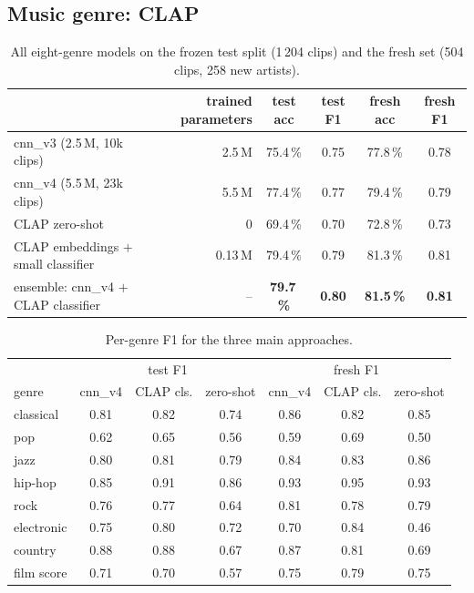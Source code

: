 \documentclass[11pt]{article}
\begin{document}
\subsection{Music genre: CLAP}
\begin{table}[H]\centering\small
\begin{tabular}{lrcccc}\toprule
 & trained parameters & test acc & test F1 & fresh acc & fresh F1 \\\midrule
cnn\_v3 (2.5\,M, 10k clips) & 2.5\,M & 75.4\,\% & 0.75 & 77.8\,\% & 0.78 \\
cnn\_v4 (5.5\,M, 23k clips) & 5.5\,M & 77.4\,\% & 0.77 & 79.4\,\% & 0.79 \\
CLAP zero-shot & 0 & 69.4\,\% & 0.70 & 72.8\,\% & 0.73 \\
CLAP embeddings $+$ small classifier & 0.13\,M & 79.4\,\% & 0.79 & 81.3\,\% & 0.81 \\
ensemble: cnn\_v4 $+$ CLAP classifier & -- & \textbf{79.7\,\%} & \textbf{0.80} & \textbf{81.5\,\%} & \textbf{0.81} \\\bottomrule
\end{tabular}
\caption{All eight-genre models on the frozen test split (1\,204 clips) and the fresh set (504 clips, 258 new artists).}\label{tab:final}
\end{table}
\begin{table}[H]\centering\small
\begin{tabular}{lccc|ccc}\toprule
 & \multicolumn{3}{c|}{test F1} & \multicolumn{3}{c}{fresh F1} \\
genre & cnn\_v4 & CLAP cls. & zero-shot & cnn\_v4 & CLAP cls. & zero-shot \\\midrule
classical & 0.81 & 0.82 & 0.74 & 0.86 & 0.82 & 0.85 \\
pop & 0.62 & 0.65 & 0.56 & 0.59 & 0.69 & 0.50 \\
jazz & 0.80 & 0.81 & 0.79 & 0.84 & 0.83 & 0.86 \\
hip-hop & 0.85 & 0.91 & 0.86 & 0.93 & 0.95 & 0.93 \\
rock & 0.76 & 0.77 & 0.64 & 0.81 & 0.78 & 0.79 \\
electronic & 0.75 & 0.80 & 0.72 & 0.70 & 0.84 & 0.46 \\
country & 0.88 & 0.88 & 0.67 & 0.87 & 0.81 & 0.69 \\
film score & 0.71 & 0.70 & 0.57 & 0.75 & 0.79 & 0.75 \\\bottomrule
\end{tabular}
\caption{Per-genre F1 for the three main approaches.}
\end{table}
\end{document}

